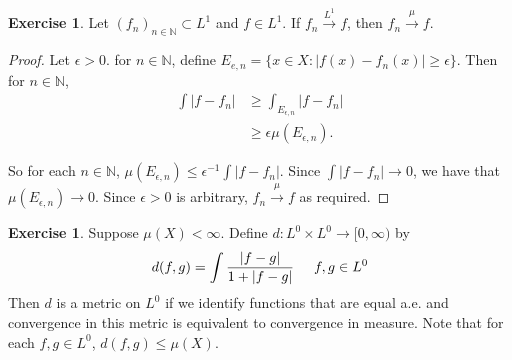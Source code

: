 \documentclass[12pt]{amsart}
\theoremstyle{definition}
\newtheorem{ex}[definition]{Exercise}
\newcommand{\ep}{\epsilon}
\newcommand{\N}{\mathbb{N}}
\newcommand{\Rg}{[0,\infty)}
\newcommand{\conv}[1]{\xrightarrow{#1}}
\begin{document}
	\begin{ex}
		Let $(f_n)_{n \in \N} \subset L^1$ and $f \in L^1$. If $f_n \xrightarrow{L^1}f$, then $f_n \conv{\mu} f$.
	\end{ex}
	
	\begin{proof}
		Let $\ep >0$. for $n \in \N$, define $E_{e,n} = \{x \in X: |f(x) - f_n(x)|\geq \ep\}$. Then for $n \in \N$,
		\begin{align*}
			\int |f - f_n|
			& \geq \int_{E_{\ep,n}} |f- f_n|\\
			& \geq \ep \mu(E_{\ep,n}).
		\end{align*}
		
		So for each $n \in \N$, $\mu(E_{\ep, n}) \leq \ep^{-1}\int |f - f_n|$. Since $\int |f - f_n| \conv{} 0$, we have that $\mu(E_{\ep,n}) \conv{} 0$. Since $\ep >0$ is arbitrary, $f_n \conv{\mu} f$ as required. 
	\end{proof}
	
	\begin{ex}
		Suppose $\mu(X) < \infty$. Define $d:L^0 \times L^0 \rightarrow \Rg$ by $$d(f,g) = \int \frac{|f-g|}{1+|f-g|} \hspace{5mm} f,g \in L^0$$
		Then $d$ is a metric on $L^0$ if we identify functions that are equal a.e. and convergence in this metric is equivalent to convergence in measure. Note that for each $f,g \in L^0$, $d(f,g) \leq \mu(X)$.
	\end{ex} 
	
\end{document}
